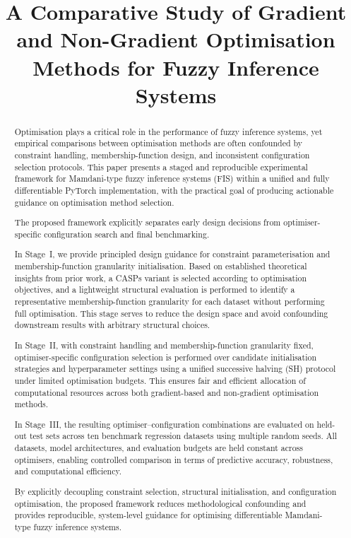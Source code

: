 \documentclass[conference]{IEEEtran}
\begin{document}
\title{A Comparative Study of Gradient and Non-Gradient Optimisation Methods for Fuzzy Inference Systems}

\author{}
\maketitle

\begin{abstract}
Optimisation plays a critical role in the performance of fuzzy inference systems,
yet empirical comparisons between optimisation methods are often confounded by
constraint handling, membership-function design, and inconsistent configuration
selection protocols.
This paper presents a staged and reproducible experimental framework for
Mamdani-type fuzzy inference systems (FIS) within a unified and fully
differentiable PyTorch implementation, with the practical goal of producing
actionable guidance on optimisation method selection.

The proposed framework explicitly separates early design decisions from
optimiser-specific configuration search and final benchmarking.

In Stage~I, we provide principled design guidance for constraint parameterisation
and membership-function granularity initialisation.
Based on established theoretical insights from prior work, a CASPs variant is
selected according to optimisation objectives, and a lightweight structural evaluation is performed to identify a representative
membership-function granularity for each dataset without performing full optimisation.
This stage serves to reduce the design space and avoid confounding downstream
results with arbitrary structural choices.

In Stage~II, with constraint handling and membership-function granularity fixed,
optimiser-specific configuration selection is performed over candidate
initialisation strategies and hyperparameter settings using a unified successive
halving (SH) protocol under limited optimisation budgets.
This ensures fair and efficient allocation of computational resources across
both gradient-based and non-gradient optimisation methods.

In Stage~III, the resulting optimiser--configuration combinations are evaluated
on held-out test sets across ten benchmark regression datasets using multiple
random seeds.
All datasets, model architectures, and evaluation budgets are held constant
across optimisers, enabling controlled comparison in terms of predictive
accuracy, robustness, and computational efficiency.

By explicitly decoupling constraint selection, structural initialisation, and
configuration optimisation, the proposed framework reduces methodological
confounding and provides reproducible, system-level guidance for optimising
differentiable Mamdani-type fuzzy inference systems.
\end{abstract}
\end{document}
